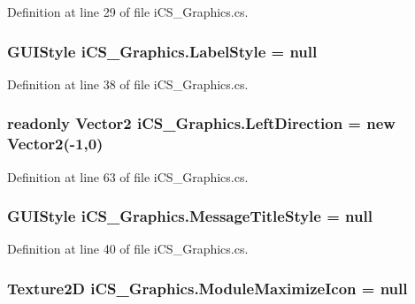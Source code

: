 Definition at line 29 of file i\+C\+S\+\_\+\+Graphics.\+cs.

\hypertarget{classi_c_s___graphics_a694bf9ea3617ff4af68f040de77a8a98}{
\subsubsection[{Label\+Style}]{\setlength{\rightskip}{0pt plus 5cm}G\+U\+I\+Style i\+C\+S\+\_\+\+Graphics.\+Label\+Style = null}}\label{classi_c_s___graphics_a694bf9ea3617ff4af68f040de77a8a98}


Definition at line 38 of file i\+C\+S\+\_\+\+Graphics.\+cs.

\hypertarget{classi_c_s___graphics_a6a4f41c28b78e4c6161dc7c7f6d30b10}{
\subsubsection[{Left\+Direction}]{\setlength{\rightskip}{0pt plus 5cm}readonly Vector2 i\+C\+S\+\_\+\+Graphics.\+Left\+Direction = new Vector2(-\/1,0)\hspace{0.3cm}{\ttfamily [static]}}}\label{classi_c_s___graphics_a6a4f41c28b78e4c6161dc7c7f6d30b10}


Definition at line 63 of file i\+C\+S\+\_\+\+Graphics.\+cs.

\hypertarget{classi_c_s___graphics_a9de32afd9ed0d1bda56641d0cea8e095}{
\subsubsection[{Message\+Title\+Style}]{\setlength{\rightskip}{0pt plus 5cm}G\+U\+I\+Style i\+C\+S\+\_\+\+Graphics.\+Message\+Title\+Style = null}}\label{classi_c_s___graphics_a9de32afd9ed0d1bda56641d0cea8e095}


Definition at line 40 of file i\+C\+S\+\_\+\+Graphics.\+cs.

\hypertarget{classi_c_s___graphics_aec14087e6b8553959172a6700c637e39}{
\subsubsection[{Module\+Maximize\+Icon}]{\setlength{\rightskip}{0pt plus 5cm}Texture2\+D i\+C\+S\+\_\+\+Graphics.\+Module\+Maximize\+Icon = null}}\label{classi_c_s___graphics_aec14087e6b8553959172a6700c637e39}


